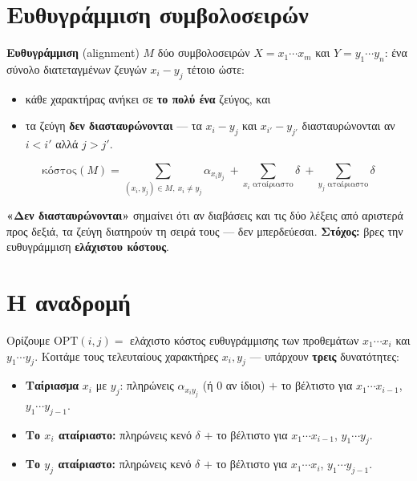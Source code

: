 \documentclass[11pt,a4paper]{article}
\begin{document}
\section{Ευθυγράμμιση συμβολοσειρών}

\begin{keypoint}
\textbf{Ευθυγράμμιση} (alignment) $M$ δύο συμβολοσειρών $X = x_1 \cdots x_m$ και
$Y = y_1 \cdots y_n$: ένα σύνολο διατεταγμένων ζευγών $x_i - y_j$ τέτοιο ώστε:
\begin{itemize}
  \item κάθε χαρακτήρας ανήκει σε \textbf{το πολύ ένα} ζεύγος, και
  \item τα ζεύγη \textbf{δεν διασταυρώνονται} --- τα $x_i - y_j$ και
  $x_{i'} - y_{j'}$ διασταυρώνονται αν $i < i'$ αλλά $j > j'$.
\end{itemize}
\[
\text{κόστος}(M) = \sum_{(x_i, y_j) \in M,\ x_i \ne y_j} \alpha_{x_i y_j} \ +
\sum_{x_i \text{ αταίριαστο}} \delta \ + \sum_{y_j \text{ αταίριαστο}} \delta
\]
\end{keypoint}

\begin{intuition}
\textbf{«Δεν διασταυρώνονται»} σημαίνει ότι αν διαβάσεις και τις δύο λέξεις από
αριστερά προς δεξιά, τα ζεύγη διατηρούν τη σειρά τους --- δεν μπερδεύεσαι.
\textbf{Στόχος:} βρες την ευθυγράμμιση \textbf{ελάχιστου κόστους}.
\end{intuition}

\section{Η αναδρομή}

Ορίζουμε $\text{OPT}(i, j) = $ ελάχιστο κόστος ευθυγράμμισης των προθεμάτων
$x_1 \cdots x_i$ και $y_1 \cdots y_j$. Κοιτάμε τους τελευταίους χαρακτήρες
$x_i, y_j$ --- υπάρχουν \textbf{τρεις} δυνατότητες:
\begin{itemize}
  \item \textbf{Ταίριασμα} $x_i$ με $y_j$: πληρώνεις $\alpha_{x_i y_j}$ (ή $0$
  αν ίδιοι) $+$ το βέλτιστο για $x_1 \cdots x_{i-1}$, $y_1 \cdots y_{j-1}$.
  \item \textbf{Το $x_i$ αταίριαστο:} πληρώνεις κενό $\delta$ $+$ το βέλτιστο
  για $x_1 \cdots x_{i-1}$, $y_1 \cdots y_j$.
  \item \textbf{Το $y_j$ αταίριαστο:} πληρώνεις κενό $\delta$ $+$ το βέλτιστο
  για $x_1 \cdots x_i$, $y_1 \cdots y_{j-1}$.
\end{itemize}
\end{document}
